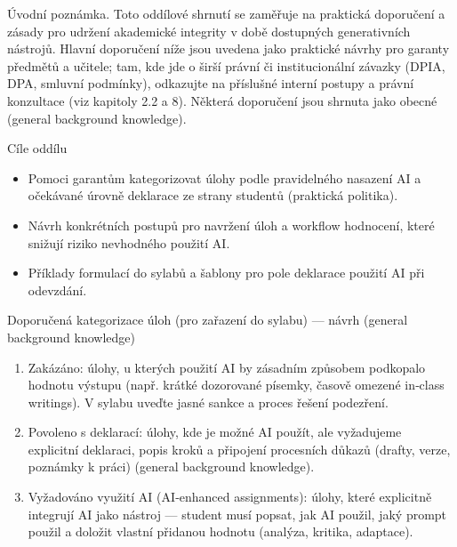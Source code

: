 Úvodní poznámka. Toto oddílové shrnutí se zaměřuje na praktická doporučení a zásady pro udržení akademické integrity v době dostupných generativních nástrojů. Hlavní doporučení níže jsou uvedena jako praktické návrhy pro garanty předmětů a učitele; tam, kde jde o širší právní či institucionální závazky (DPIA, DPA, smluvní podmínky), odkazujte na příslušné interní postupy a právní konzultace (viz kapitoly 2.2 a 8). Některá doporučení jsou shrnuta jako obecné (general background knowledge).

Cíle oddílu
\begin{itemize}
  \item Pomoci garantům kategorizovat úlohy podle pravidelného nasazení AI a očekávané úrovně deklarace ze strany studentů (praktická politika).
  \item Návrh konkrétních postupů pro navržení úloh a workflow hodnocení, které snižují riziko nevhodného použití AI.
  \item Příklady formulací do sylabů a šablony pro pole deklarace použití AI při odevzdání.
\end{itemize}

Doporučená kategorizace úloh (pro zařazení do sylabu) — návrh (general background knowledge)
\begin{enumerate}
  \item Zakázáno: úlohy, u kterých použití AI by zásadním způsobem podkopalo hodnotu výstupu (např. krátké dozorované písemky, časově omezené in‑class writings). V sylabu uveďte jasné sankce a proces řešení podezření.
  \item Povoleno s deklarací: úlohy, kde je možné AI použít, ale vyžadujeme explicitní deklaraci, popis kroků a připojení procesních důkazů (drafty, verze, poznámky k práci) (general background knowledge).
  \item Vyžadováno využití AI (AI‑enhanced assignments): úlohy, které explicitně integrují AI jako nástroj — student musí popsat, jak AI použil, jaký prompt použil a doložit vlastní přidanou hodnotu (analýza, kritika, adaptace).
\end{enumerate}

